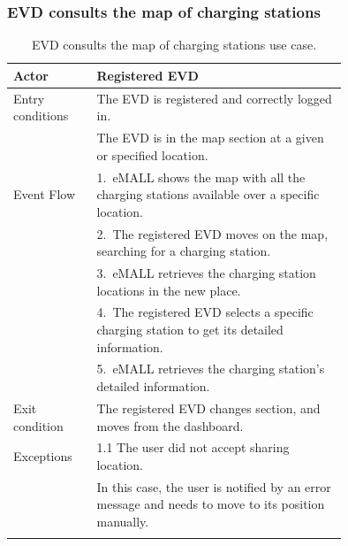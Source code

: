 \subsubsection*{EVD consults the map of charging stations}
\begin{center}
    \begin{longtable}{lp{0.75\linewidth}}
        \hline
        Actor            & Registered EVD                                                                                     \\
        \hline
        Entry conditions & The EVD is registered and correctly logged in.                                                     \\
        & The EVD is in the map section at a given or specified location.                                    \\
        \hline
        Event Flow       & 1.\ eMALL shows the map with all the charging stations available over a specific location.         \\
        & 2.\ The registered EVD moves on the map, searching for a charging station.                         \\
        & 3.\ eMALL retrieves the charging station locations in the new place.                               \\
        & 4.\ The registered EVD selects a specific charging station to get its detailed information.        \\
        & 5.\ eMALL retrieves the charging station's detailed information.                                   \\
        \hline
        Exit condition   & The registered EVD changes section, and moves from the dashboard.                                  \\
        \hline
        Exceptions       & 1.1 The user did not accept sharing location.                                                      \\
        & In this case, the user is notified by an error message and needs to move to its position manually. \\
        \hline
        \caption{EVD consults the map of charging stations use case.}
        \label{tab: EVD_map_charging_stations_use_case}
    \end{longtable}
\end{center}

